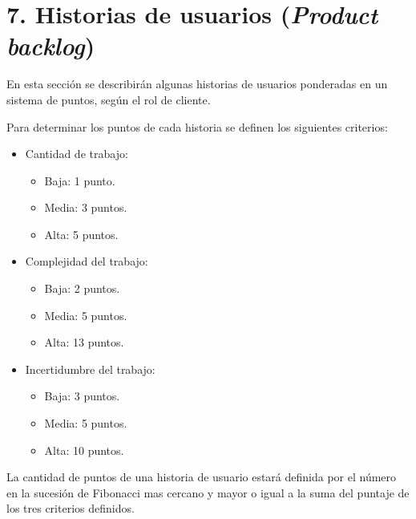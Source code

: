 \documentclass[
11pt, %
]{charter}
\begin{document}
\section{7. Historias de usuarios (\textit{Product backlog})}
\label{sec:backlog}

En esta sección se describirán algunas historias de usuarios ponderadas en un sistema de puntos, según el rol de cliente.

Para determinar los puntos de cada historia se definen los siguientes criterios:
\begin{itemize}
	\item Cantidad de trabajo:
	\begin{itemize}
		\item Baja: 1 punto.
		\item Media: 3 puntos.
		\item Alta: 5 puntos.
	\end{itemize}
	\item Complejidad del trabajo:
		\begin{itemize}
			\item Baja: 2 puntos.
			\item Media: 5 puntos.
			\item Alta: 13 puntos.
		\end{itemize}
	\item Incertidumbre del trabajo:
		\begin{itemize}
			\item Baja: 3 puntos.
			\item Media: 5 puntos.
			\item Alta: 10 puntos.
		\end{itemize}
\end{itemize}

La cantidad de puntos de una historia de usuario estará definida por el número en la sucesión de Fibonacci mas cercano y mayor o igual a la suma del puntaje de los tres criterios definidos.
\end{document}
